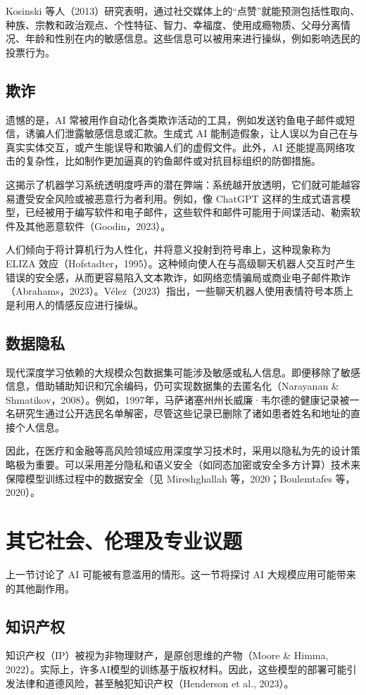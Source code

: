 Kosinski 等人（2013）研究表明，通过社交媒体上的“点赞”就能预测包括性取向、种族、宗教和政治观点、个性特征、智力、幸福度、使用成瘾物质、父母分离情况、年龄和性别在内的敏感信息。这些信息可以被用来进行操纵，例如影响选民的投票行为。

\subsection{欺诈}
遗憾的是，AI 常被用作自动化各类欺诈活动的工具，例如发送钓鱼电子邮件或短信，诱骗人们泄露敏感信息或汇款。生成式 AI 能制造假象，让人误以为自己在与真实实体交互，或产生能误导和欺骗人们的虚假文件。此外，AI 还能提高网络攻击的复杂性，比如制作更加逼真的钓鱼邮件或对抗目标组织的防御措施。

这揭示了机器学习系统透明度呼声的潜在弊端：系统越开放透明，它们就可能越容易遭受安全风险或被恶意行为者利用。例如，像 ChatGPT 这样的生成式语言模型，已经被用于编写软件和电子邮件，这些软件和邮件可能用于间谍活动、勒索软件及其他恶意软件（Goodin，2023）。

人们倾向于将计算机行为人性化，并将意义投射到符号串上，这种现象称为 ELIZA 效应（Hofstadter，1995）。这种倾向使人在与高级聊天机器人交互时产生错误的安全感，从而更容易陷入文本欺诈，如网络恋情骗局或商业电子邮件欺诈（Abrahams，2023）。Vélez（2023）指出，一些聊天机器人使用表情符号本质上是利用人的情感反应进行操纵。

\subsection{数据隐私}
现代深度学习依赖的大规模众包数据集可能涉及敏感或私人信息。即便移除了敏感信息，借助辅助知识和冗余编码，仍可实现数据集的去匿名化（Narayanan \& Shmatikov，2008）。例如，1997年，马萨诸塞州州长威廉·韦尔德的健康记录被一名研究生通过公开选民名单解密，尽管这些记录已删除了诸如患者姓名和地址的直接个人信息。

因此，在医疗和金融等高风险领域应用深度学习技术时，采用以隐私为先的设计策略极为重要。可以采用差分隐私和语义安全（如同态加密或安全多方计算）技术来保障模型训练过程中的数据安全（见 Mireshghallah 等，2020；Boulemtafes 等，2020）。

\section{其它社会、伦理及专业议题}
上一节讨论了 AI 可能被有意滥用的情形。这一节将探讨 AI 大规模应用可能带来的其他副作用。

\subsection{知识产权}
知识产权（IP）被视为非物理财产，是原创思维的产物（Moore \& Himma, 2022）。实际上，许多AI模型的训练基于版权材料。因此，这些模型的部署可能引发法律和道德风险，甚至触犯知识产权（Henderson et al., 2023）。


